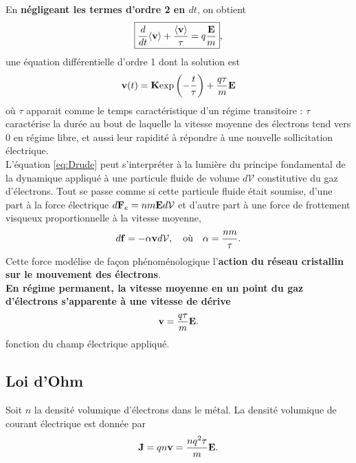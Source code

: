 \documentclass[11pt,a4paper]{report}
\begin{document}
En \textbf{négligeant les termes d'ordre 2 en $dt$}, on obtient
\begin{equation}
	\boxed{\frac{d}{dt}\langle\bold{v}\rangle + \frac{\langle\bold{v}\rangle}{\tau} =  q\frac{\bold{E}}{m}},
	\label{eq:Drude}
\end{equation}
une équation différentielle d'ordre 1 dont la solution est
\begin{equation}
	\bold{v}(t) = \bold{K}\text{exp}\left(-\frac{t}{\tau}\right) + \frac{q\tau}{m}\bold{E}
\end{equation}
où $\tau$ apparait comme le temps caractéristique d'un régime transitoire : $\tau$ caractérise la durée au bout de laquelle la vitesse moyenne des électrons tend vers 0 en régime libre, et aussi leur rapidité à répondre à une nouvelle sollicitation électrique.\\ 

L'équation \eqref{eq:Drude} peut s'interpréter à la lumière du principe fondamental de la dynamique appliqué à une particule fluide de volume $d\mathcal{V}$ constitutive du gaz d'électrons. Tout se passe comme si cette particule fluide était soumise, d'une part à la force électrique $d\bold{F}_e = n m \bold{E} d\mathcal{V}$ et d'autre part à une force de frottement visqueux proportionnelle à la vitesse moyenne,
\begin{equation}
	d\bold{f} = -\alpha \bold{v} d\mathcal{V}, \quad\text{où}\quad \alpha = \frac{nm}{\tau}.
\end{equation}
Cette force modélise de façon phénoménologique l'\textbf{action du réseau cristallin sur le mouvement des électrons}.\\

\textbf{En régime permanent, la vitesse moyenne en un point du gaz d'électrons s'apparente à une vitesse de dérive}
\begin{equation}
	\bold{v} = \frac{q\tau}{m}\bold{E}.
\end{equation}
fonction du champ électrique appliqué.\\

\newpage
\subsection{Loi d'Ohm}

Soit $n$ la densité volumique d'électrons dans le métal. La densité volumique de courant électrique est donnée par
\begin{equation}
	\bold{J} = q n \bold{v} = \frac{n q^2\tau}{m} \bold{E}.\\
\end{equation}
\end{document}
